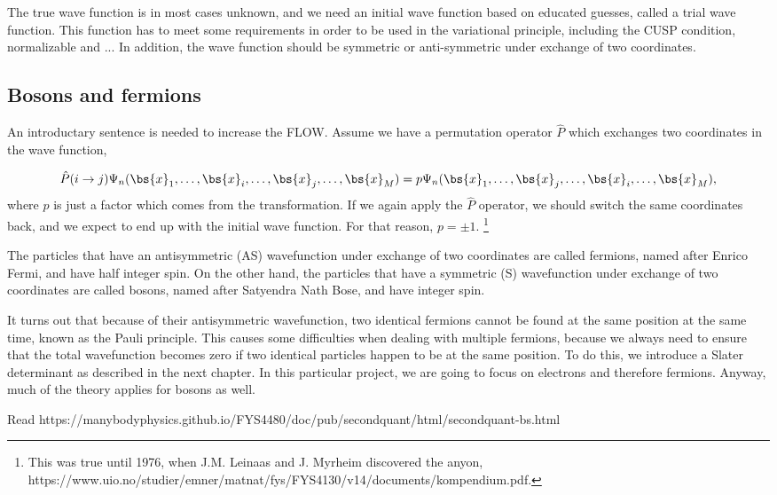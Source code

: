 The true wave function is in most cases unknown, and we need an initial wave function based on educated guesses, called a trial wave function. This function has to meet some requirements in order to be used in the variational principle, including the CUSP condition, normalizable and ... In addition, the wave function should be symmetric or anti-symmetric under exchange of two coordinates.

\subsection{Bosons and fermions} \label{subsubsec:symmetry}
An introductary sentence is needed to increase the FLOW. 
Assume we have a permutation operator $\hat{P}$ which exchanges two coordinates in the wave function,

\begin{equation}
\hat{P}(i\rightarrow j)\Psi_n(\bs{x}_1,\hdots,\bs{x}_i,\hdots,\bs{x}_j,\hdots,\bs{x}_M)=p\Psi_n(\bs{x}_1,\hdots,\bs{x}_j,\hdots,\bs{x}_i,\hdots,\bs{x}_M),
\end{equation}
where $p$ is just a factor which comes from the transformation. If we again apply the $\hat{P}$ operator, we should switch the same coordinates back, and we expect to end up with the initial wave function. For that reason, $p=\pm1$. \footnote{This was true until 1976, when J.M. Leinaas and J. Myrheim discovered the anyon, https://www.uio.no/studier/emner/matnat/fys/FYS4130/v14/documents/kompendium.pdf.}

The particles that have an antisymmetric (AS) wavefunction under exchange of two coordinates are called fermions, named after Enrico Fermi, and have half integer spin. On the other hand, the particles that have a symmetric (S) wavefunction under exchange of two coordinates are called bosons, named after Satyendra Nath Bose, and have integer spin. 

It turns out that because of their antisymmetric wavefunction, two identical fermions cannot be found at the same position at the same time, known as the Pauli principle. This causes some difficulties when dealing with multiple fermions, because we always need to ensure that the total wavefunction becomes zero if two identical particles happen to be at the same position. To do this, we introduce a Slater determinant as described in the next chapter. In this particular project, we are going to focus on electrons and therefore fermions. Anyway, much of the theory applies for bosons as well.

Read https://manybodyphysics.github.io/FYS4480/doc/pub/secondquant/html/secondquant-bs.html

